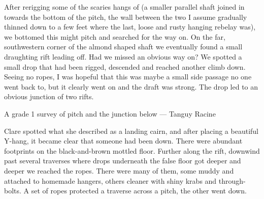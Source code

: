 After rerigging some of the scaries hangs of  (a smaller parallel shaft joined in towards the bottom of the pitch, the wall between the two I assume gradually thinned down to a few feet where the last, loose and rusty hanging rebelay was), we bottomed this might pitch and searched for the way on. On the far, southwestern corner of the almond shaped shaft  we eventually found a small draughting rift leading off. Had we missed an obvious way on? We spotted a small drop that had been rigged, descended and reached another climb down. Seeing no ropes, I was hopeful that this was maybe a small side passage no one went back to, but it clearly went on and the draft was strong. The drop led to an obvious junction of two rifts.

\begin{survey*}[t]
\checkoddpage \ifoddpage \forcerectofloat \else \forceversofloat \fi
\centering
{}
\caption[TTT pitch (grade 1)]{A grade 1 survey of \protect{} pitch and the \protect{} junction below --- Tanguy Racine}
\label{Grade 1 survey}
\end{survey*}

Clare spotted what she described as a landing cairn, and after placing a beautiful Y-hang, it became clear that someone had been down. There were abundant footprints on the black-and-brown mottled floor. Further along the rift, downwind past several traverses where drops underneath the false floor got deeper and deeper we reached the ropes. There were many of them, some muddy and attached to homemade hangers, others cleaner with shiny krabs and through-bolts. A set of ropes protected a traverse across a pitch, the other went down.

